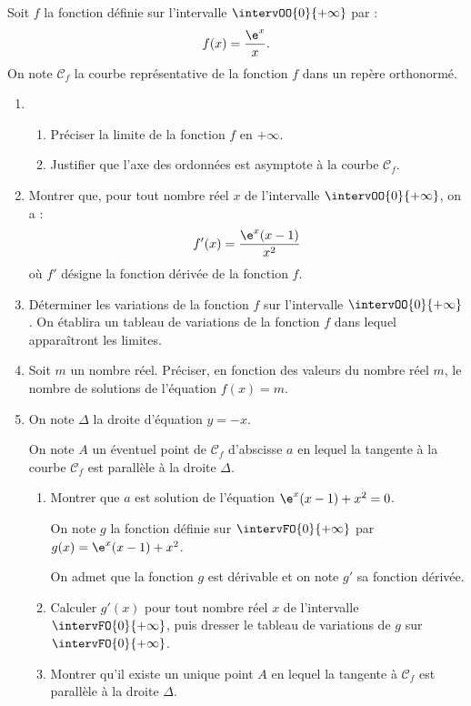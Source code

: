 Soit $f$ la fonction définie sur l’intervalle $\intervOO{0}{+\infty}$ par : \[f(x)=\dfrac{\e^x}{x}.\]
%
On note $\mathcal{C}_f$ la courbe représentative de la fonction $f$ dans un repère orthonormé.

\begin{enumerate}
	\item 
	\begin{enumerate}
		\item Préciser la limite de la fonction $f$ en $+\infty$.
		\item Justifier que l’axe des ordonnées est asymptote à la courbe $\mathcal{C}_f$.
	\end{enumerate}
	\item Montrer que, pour tout nombre réel $x$ de l’intervalle $\intervOO{0}{+\infty}$, on a : \[f'(x)= \dfrac{\e^x(x-1)}{x^2}\] où $f'$ désigne la fonction dérivée de la fonction $f$.
	\item Déterminer les variations de la fonction $f$ sur l’intervalle $\intervOO{0}{+\infty}$. On établira un tableau de variations de la fonction $f$ dans lequel apparaîtront les limites.
	\item Soit $m$ un nombre réel. Préciser, en fonction des valeurs du nombre réel $m$, le nombre de solutions de l’équation $f(x)=m$.
	\item On note $\Delta$ la droite d’équation $y=-x$.
	
	On note $A$ un éventuel point de $\mathcal{C}_f$ d’abscisse $a$ en lequel la tangente à la courbe $\mathcal{C}_f$ est parallèle à la droite $\Delta$.
	\begin{enumerate}
		\item Montrer que $a$ est solution de l’équation $\e^x(x-1)+x^2=0$.
		
		\smallskip
		
		On note $g$ la fonction définie sur $\intervFO{0}{+\infty}$ par $g(x)=\e^x(x-1)+x^2$.
		
		On admet que la fonction $g$ est dérivable et on note $g'$ sa fonction dérivée.
		\item Calculer $g'(x)$ pour tout nombre réel $x$ de l’intervalle $\intervFO{0}{+\infty}$, puis dresser le tableau de variations de $g$ sur $\intervFO{0}{+\infty}$.
		\item Montrer qu’il existe un unique point $A$ en lequel la tangente à $\mathcal{C}_f$ est parallèle à la droite $\Delta$.
	\end{enumerate}
\end{enumerate}

